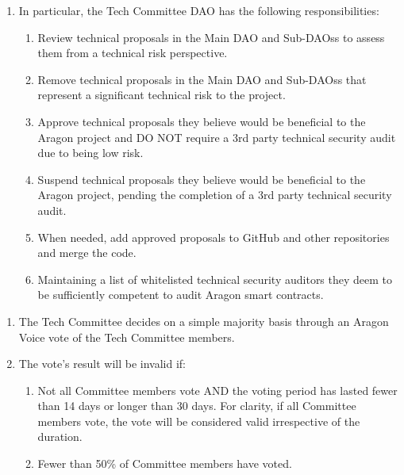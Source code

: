 \begin{enumerate}
	\begin{enumerate}
		
		\begin{enumerate}
			
			\item In particular, the Tech Committee \ac{DAO} has the following responsibilities:
			\begin{enumerate}		
				\item Review technical proposals in the Main \ac{DAO} and Sub-\acp{DAO}s to assess them from a technical risk perspective.
				\item Remove technical proposals in the Main \ac{DAO} and Sub-\acp{DAO}s that represent a significant technical risk to the project.
				\item Approve technical proposals they believe would be beneficial to the Aragon project and DO NOT require a 3rd party technical security audit due to being low risk.
				\item Suspend technical proposals they believe would be beneficial to the Aragon project, pending the completion of a 3rd party technical security audit.
				\item When needed, add approved proposals to GitHub and other repositories and merge the code.
				\item Maintaining a list of whitelisted technical security auditors they deem to be sufficiently competent to audit Aragon smart contracts.
			\end{enumerate}
		
		\end{enumerate}
	
		\begin{enumerate}
			\item The Tech Committee decides on a simple majority basis through an Aragon Voice vote of the Tech Committee members.
			\item The vote’s result will be invalid if:
			\begin{enumerate}
				\item Not all Committee members vote AND the voting period has lasted
				fewer than 14 days or longer than 30 days.
				For clarity, if all Committee members vote, the vote will be considered valid irrespective of the duration.
				\item Fewer than 50\% of Committee members have voted.
			\end{enumerate}
		\end{enumerate}
	

\end{enumerate}
\end{enumerate}
